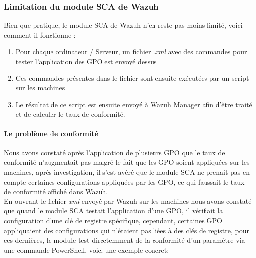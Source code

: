 \documentclass[a4paper, 11pt]{article}
\begin{document}
\subsubsection{Limitation du module SCA de Wazuh}

Bien que pratique, le module SCA de Wazuh n'en reste pas moins limité, voici comment il fonctionne :\\

\begin{enumerate}
  \item Pour chaque ordinateur / Serveur, un fichier \textit{.xml} avec des commandes pour tester l'application des GPO est envoyé dessus
  \item Ces commandes présentes dans le fichier sont ensuite exécutées par un script sur les machines
  \item Le résultat de ce script est ensuite envoyé à Wazuh Manager afin d'être traité et de calculer le taux de conformité.
\end{enumerate}


\par\bigskip
\paragraph{Le problème de conformité}


Nous avons constaté après l'application de plusieurs GPO que le taux de conformité n'augmentait pas malgré le fait que les GPO soient appliquées sur les machines,
 après investigation, il s'est avéré que le module SCA ne prenait pas en compte certaines configurations appliquées par les GPO,
  ce qui faussait le taux de conformité affiché dans Wazuh.\\

  En ouvrant le fichier \textit{xml} envoyé par Wazuh sur les machines nous avons constaté que quand le module SCA testait 
  l'application d'une GPO, il vérifiait la configuration d'une clé de registre spécifique, cependant, certaines GPO appliquaient des configurations qui n'étaient pas liées à des clés de registre,
 pour ces dernières, le module test directemment de la conformité d'un paramètre via une commande PowerShell, voici une exemple concret:
\end{document}
